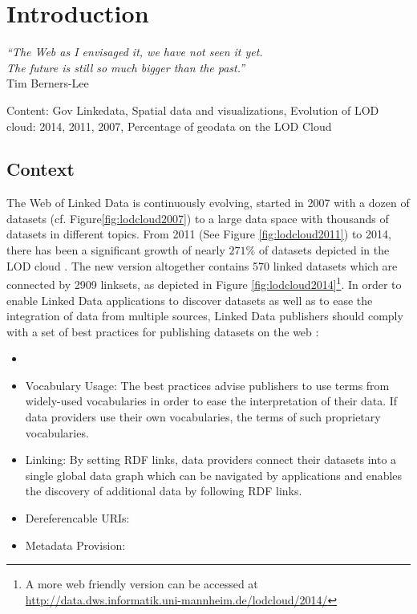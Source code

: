 \chapter{Introduction}
\label{intro}

\begin{flushright}
\textit{``The Web as I envisaged it, we have not seen it yet.\\ 
The future is still so much bigger than the past.''\\}
Tim Berners-Lee
\end{flushright}
Content: Gov Linkedata, Spatial data and visualizations, Evolution of LOD cloud: 2014, 2011, 2007, Percentage of geodata on the LOD Cloud


\section{Context}
\label{sec:context}

The Web of Linked Data is continuously evolving, started in 2007 with a dozen of datasets (cf. Figure\ref{fig:lodcloud2007}) to a large data space with thousands of datasets in different topics. From 2011 (See Figure \ref{fig:lodcloud2011})\cite{jentzsch2011} to 2014, there has been a significant growth of nearly $271\%$ of datasets depicted in the LOD cloud \cite{max2014}. The new version altogether contains 570 linked datasets which are connected by 2909 linksets, as depicted in Figure \ref{fig:lodcloud2014}\footnote{A more web friendly version can be accessed at \url{http://data.dws.informatik.uni-mannheim.de/lodcloud/2014/}}. In order to enable
Linked Data applications to discover datasets as well as to ease the integration of data from multiple sources, Linked Data publishers should comply with a set of best practices for publishing datasets on the web \cite{Heath2011}:

\begin{itemize}
\item {}

\item Vocabulary Usage: The best practices advise publishers to use terms from
widely-used vocabularies in order to ease the interpretation of their data. If data providers use their own vocabularies, the terms of such proprietary vocabularies.

\item Linking: By setting RDF links, data providers connect their datasets into a single global data graph which can be navigated by applications and enables the discovery of additional data by following RDF links.

\item Dereferencable URIs:  

\item Metadata Provision: 
\end{itemize}



